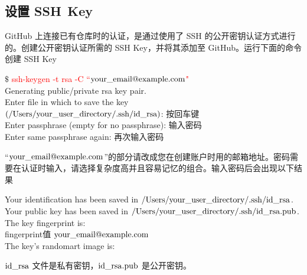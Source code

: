 \documentclass[12pt,a4paper]{article}
\begin{document}
\subsection{设置 SSH Key}
GitHub 上连接已有仓库时的认证，是通过使用了 SSH 的公开密钥认证方式进行的。创建公开密钥认证所需的 SSH Key，并将其添加至 GitHub。运行下面的命令创建 SSH Key
\begin{tcolorbox}[colback=green!5,colframe=green!40!black,title= ]
$\$$ \textcolor{red}{ssh-keygen -t rsa -C ``$\rm your\_email@example.com$"} \\
Generating public/private rsa key pair. \\
Enter file in which to save the key \\
$\rm (/Users/your\_user\_directory/.ssh/id\_rsa)$: 按回车键 \\
Enter passphrase (empty for no passphrase): 输入密码 \\
Enter same passphrase again: 再次输入密码
\end{tcolorbox}
``$\rm your\_email@example.com$”的部分请改成您在创建账户时用的邮箱地址。密码需要在认证时输入，请选择复杂度高并且容易记忆的组合。输入密码后会出现以下结果
\begin{tcolorbox}[colback=green!5,colframe=green!40!black,title= ]
Your identification has been saved in $\rm /Users/your\_user\_directory/.ssh/id\_rsa$. \\
Your public key has been saved in $\rm /Users/your\_user\_directory/.ssh/id\_rsa.pub$. \\
The key fingerprint is: \\
fingerprint值 $\rm your\_email@example.com$ \\
The key's randomart image is:
\end{tcolorbox}
$\rm id\_rsa$ 文件是私有密钥，$\rm id\_rsa.pub$ 是公开密钥。
\end{document}
